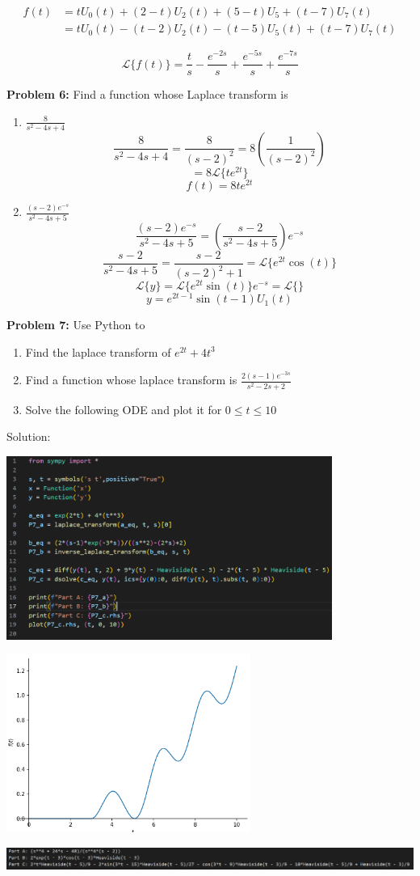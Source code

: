 \documentclass[12pt]{article}
\renewcommand{\L}[1]{\mathcal{L}\{#1\}}
\begin{document}
\begin{align*}
    f(t) &= tU_0(t) + (2 - t)U_2(t) + (5 -t) U_5 + (t - 7)U_7(t)\\
    &= tU_0(t) - (t - 2)U_2(t) - (t - 5)U_5(t) + (t - 7)U_7(t)
\end{align*}

\[\boxed{\L{f(t)} = \frac{t}{s} - \frac{e^{-2s}}{s} + \frac{e^{-5s}}{s} + \frac{e^{-7s}}{s}}\]

\pagebreak 

\textbf{Problem 6:} Find a function whose Laplace transform is
\begin{enumerate}
    \item $\frac{8}{s^2 -4s + 4}$
    \[\frac{8}{s^2 - 4s + 4} = \frac{8}{(s-2)^2} = 8\left(\frac{1}{(s-2)^2}\right)\]
    \[= 8\L{te^{2t}}\]
    \[\boxed{f(t) = 8te^{2t}}\]

    \item $\frac{(s-2)e^{-s}}{s^2 - 4s + 5}$
    \[\frac{(s-2)e^{-s}}{s^2 - 4s + 5} = \left(\frac{s-2}{s^2 - 4s + 5}\right)e^{-s}\]
    \[\frac{s-2}{s^2 - 4s + 5} = \frac{s-2}{(s-2)^2 + 1} = \L{e^{2t}\cos (t)}\]
    \[\L{y} = \L{e^{2t}\sin(t)}e^{-s} = \L{}\]
    \[\boxed{y = e^{2t-1}\sin(t-1)U_1(t)}\]
\end{enumerate}

\pagebreak
\textbf{Problem 7:} Use Python to
\begin{enumerate}
    \item Find the laplace transform of $e^{2t} + 4t^3$
    \item Find a function whose laplace transform is $\frac{2(s-1)e^{-3s}}{s^2 - 2s + 2}$
    \item Solve the following ODE and plot it for $0 \leq t \leq 10$
\end{enumerate}

Solution:

\includegraphics[width=0.8\textwidth]{Images/p7 code.png}

\includegraphics[width=0.6\textwidth]{Images/p7 graph.png}

\includegraphics[width=1\textwidth]{Images/p7 answers.png}
\end{document}
